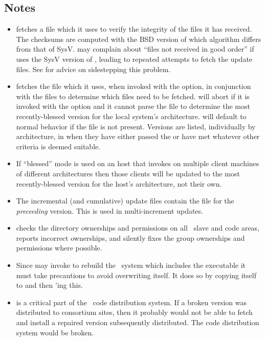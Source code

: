 \subsection*{Notes}

\begin{itemize}
\item
    fetches a  file which it uses to verify the
   integrity of the files it has received.  The checksums are computed with
   the BSD version of  which algorithm differs from that of SysV.
    may complain about ``files not received in good order'' if 
    uses the SysV version of , leading to repeated
   attempts to fetch the update files.  See 
   for advice on sidestepping this problem.

\item
    fetches the file  which it
   uses, when invoked with the  option, in conjunction with the
    files to determine which files need to be fetched.
    will abort if it is invoked with the  option and
   it cannot parse the  file to determine the most
   recently-blessed version for the local system's architecture.
    will default to normal behavior if the 
   file is not present.  Versions are listed, individually by
   architecture, in  when they have either passed the
    or have met whatever other criteria is deemed
   suitable.

\item
   If ``blessed'' mode is used on an  host that invokes
    on multiple client machines of different
   architectures then those clients will be updated to the most
   recently-blessed version for the  host's architecture,
   not their own.

\item
   The incremental (and cumulative) update files contain the 
   file for the {\em preceeding} version.  This is used in multi-increment
   updates.

\item
    checks the directory ownerships and permissions on all
   \aipspp\ slave and code areas, reports incorrect ownerships, and
   silently fixes the group ownerships and permissions where possible.

\item
   Since  may invoke  to rebuild the \aipspp\ 
   system which includes the  executable it must take precautions
   to avoid overwriting itself.  It does so by copying itself to \exe{inhale-}
   and then \unixexe{exec}'ing this.

\item
    is a critical part of the \aipspp\ code distribution system.
   If a broken version was distributed to consortium sites, then it probably
   would not be able to fetch and install a repaired version subsequently
   distributed.  The code distribution system would be broken.
\end{itemize}

